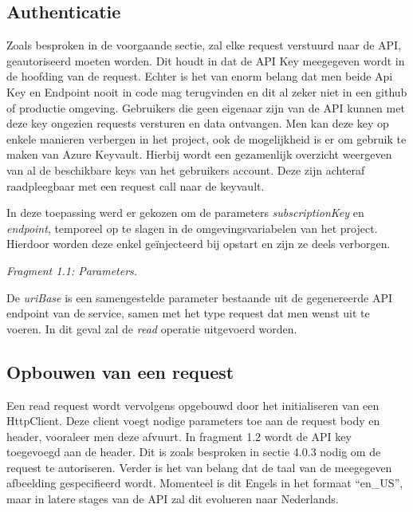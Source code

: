 \subsection{Authenticatie} 

 

Zoals besproken in de voorgaande sectie, zal elke request verstuurd naar de API, geautoriseerd moeten worden. Dit houdt in dat de API Key meegegeven wordt in de hoofding van de request. Echter is het van enorm belang dat men beide Api Key en Endpoint nooit in code mag terugvinden en dit al zeker niet in een github of productie omgeving. Gebruikers die geen eigenaar zijn van de API kunnen met deze key ongezien requests versturen en data ontvangen. Men kan deze key op enkele manieren verbergen in het project, ook de mogelijkheid is er om gebruik te maken van Azure Keyvault. Hierbij wordt een gezamenlijk overzicht weergeven van al de beschikbare keys van het gebruikers account. Deze zijn achteraf raadpleegbaar met een request call naar de keyvault. 

 

In deze toepassing werd er gekozen om de parameters \textit{subscriptionKey} en \textit{endpoint}, temporeel op te slagen in de  omgevingsvariabelen van het project. Hierdoor worden deze enkel geïnjecteerd bij opstart en zijn ze deels verborgen. 
\newline



	\textit{Fragment 1.1: Parameters.}


De \textit{uriBase} is een samengestelde parameter bestaande uit de gegenereerde API endpoint van de service, samen met het type request dat men wenst uit te voeren. In dit geval zal de \textit{read} operatie uitgevoerd worden.  

 
\subsection{Opbouwen van een request}
Een read request wordt vervolgens opgebouwd door het initialiseren van een HttpClient. Deze client voegt nodige parameters toe aan de request body en header, vooraleer men deze afvuurt. In fragment 1.2 wordt de API key toegevoegd aan de header. Dit is zoals besproken in sectie 4.0.3 nodig om de request te autoriseren. Verder is het van belang dat de taal van de meegegeven afbeelding gespecifieerd wordt. Momenteel is dit Engels in het formaat “en\_US”, maar in latere stages van de API zal dit evolueren naar Nederlands. 

